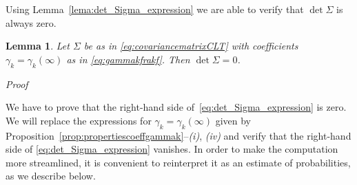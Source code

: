 \documentclass[reqno,a4paper,11pt]{amsart}
\makeatletter
\newtheorem{lemma}{Lemma}
\theoremstyle{remark}
\numberwithin{equation}{section}
\renewenvironment{proof}[1][Proof]{\par
\pushQED{\qed}%
\normalfont \topsep6\p@\@plus6\p@\relax
\trivlist
\item\relax
{\itshape
#1\@addpunct{.}}\hspace\labelsep\ignorespaces
}{%
\popQED\endtrivlist\@endpefalse
}
\makeatother
\begin{document}
Using Lemma~\ref{lema:det_Sigma_expression} we are able to verify that $\det
\Sigma$ is always zero.

\begin{lemma}
\label{lem:det_Sigma_is_zero}
Let $\Sigma$ be as in \eqref{eq:covariancematrixCLT} with coefficients $\gamma_k=\gamma_k(\infty)$ as in \eqref{eq:gammakfrakf}. Then $\det \Sigma = 0$.
\end{lemma}
\begin{proof}
We have to prove that the right-hand side of~\eqref{eq:det_Sigma_expression} is
zero. We will replace the expressions for $\gamma_k=\gamma_k(\infty)$ given by Proposition~\ref{prop:propertiescoeffgammak}--{\it (i)}, {\it (iv)} and verify that the right-hand side of \eqref{eq:det_Sigma_expression} vanishes. In order to make the computation more streamlined, it is convenient to reinterpret it as an estimate of probabilities, as we describe below.


\end{proof}
\end{document}
